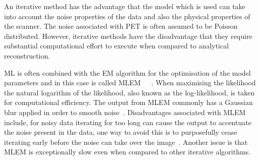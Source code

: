 
            An iterative method has the advantage that the model which is used can take into account the noise properties of the data and also the physical properties of the scanner. The noise associated with \gls{PET} is often assumed to be Poisson distributed. However, iterative methods have the disadvantage that they require substantial computational effort to execute when compared to analytical reconstruction.
            
            \gls{ML} is often combined with the \gls{EM} algorithm for the optimisation of the model parameters and in this case is called \gls{MLEM}~~~. When maximising the likelihood the natural logarithm of the likelihood, also known as the log-likelihood, is taken for computational efficiency. The output from \gls{MLEM} commonly has a Gaussian blur applied in order to smooth noise~. Disadvantages associated with \gls{MLEM} include, for noisy data iterating for too long can cause the output to accentuate the noise present in the data, one way to avoid this is to purposefully cease iterating early before the noise can take over the image~. Another issue is that \gls{MLEM} is exceptionally slow even when compared to other iterative algorithms. %
            
